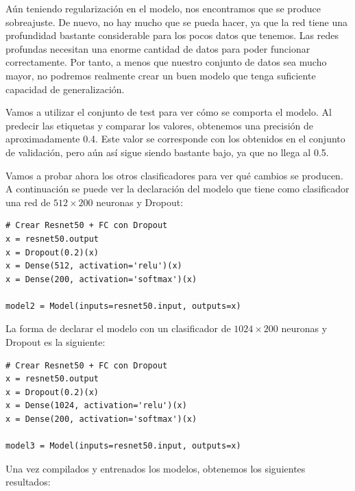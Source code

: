 \documentclass[11pt,a4paper]{article}
\begin{document}
Aún teniendo regularización en el modelo, nos encontramos que se produce sobreajuste.
De nuevo, no hay mucho que se pueda hacer, ya que la red tiene una profundidad bastante
considerable para los pocos datos que tenemos. Las redes profundas necesitan una
enorme cantidad de datos para poder funcionar correctamente. Por tanto, a menos que
nuestro conjunto de datos sea mucho mayor, no podremos realmente crear un buen modelo
que tenga suficiente capacidad de generalización.

Vamos a utilizar el conjunto de test para ver cómo se comporta el modelo. Al predecir
las etiquetas y comparar los valores, obtenemos una precisión de aproximadamente 0.4.
Este valor se corresponde con los obtenidos en el conjunto de validación, pero aún así
sigue siendo bastante bajo, ya que no llega al 0.5.

Vamos a probar ahora los otros clasificadores para ver qué cambios se producen. A continuación
se puede ver la declaración del modelo que tiene como clasificador una red de $512 \times 200$
neuronas y Dropout:

\begin{lstlisting}
# Crear Resnet50 + FC con Dropout
x = resnet50.output
x = Dropout(0.2)(x)
x = Dense(512, activation='relu')(x)
x = Dense(200, activation='softmax')(x)

model2 = Model(inputs=resnet50.input, outputs=x)
\end{lstlisting}

La forma de declarar el modelo con un clasificador de $1024 \times 200$ neuronas y Dropout
es la siguiente:

\begin{lstlisting}
# Crear Resnet50 + FC con Dropout
x = resnet50.output
x = Dropout(0.2)(x)
x = Dense(1024, activation='relu')(x)
x = Dense(200, activation='softmax')(x)

model3 = Model(inputs=resnet50.input, outputs=x)
\end{lstlisting}

Una vez compilados y entrenados los modelos, obtenemos los siguientes resultados:
\end{document}
